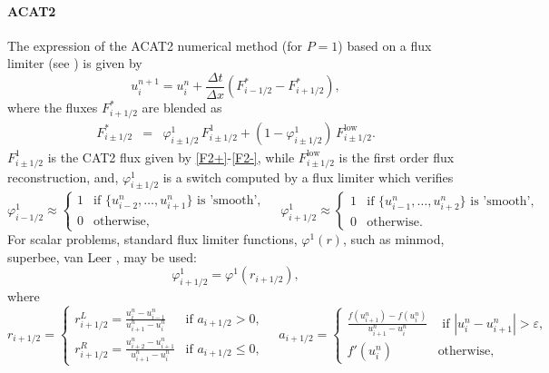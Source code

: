 \paragraph{ACAT2}
The expression of the ACAT2 numerical method (for $P=1$) based on a flux limiter (see \cite{LeVeque2002book,LeVeque2007book,Toro2009}) is given by
\begin{equation}\label{ACAT2meth}
     u_i^{n+1} = u_i^n + \frac{\Delta t}{\Delta x}\left(F^{*}_{i-1/2} - F^{*}_{i+1/2} \right) ,
\end{equation}
where the fluxes $F^{*}_{i+1/2}$ are blended as   
\begin{eqnarray}\label{ACAT2_flux} 
    {F}^*_{i\pm1/2} & = & \varphi^1_{i\pm1/2} \, {F}^1_{i\pm1/2} +(1-\varphi^1_{i\pm1/2}) \, {F}^{\text{low}}_{i\pm1/2}.
\end{eqnarray}
${F}^1_{i\pm1/2}$ is the CAT2 flux given by \eqref{F2+}-\eqref{F2-}, while $F^{\text{low}}_{i\pm1/2}$ is the first order flux reconstruction, and, $\varphi^1_{i\pm 1/2}$ is a switch computed by a flux limiter which verifies
\begin{equation} \nonumber
    \varphi^1_{i-1/2} \approx \begin{cases}
        1 &\text{if $\{ u_{i-2}^n, \dots, u_{i+1}^n \}$ is 'smooth'}, \\
        0 & \text{otherwise,}
    \end{cases}
    \quad
    \varphi^1_{i+1/2} \approx \begin{cases}
        1 &\text{if $\{ u_{i-1}^n, \dots, u_{i+2}^n \}$ is 'smooth'}, \\
        0 & \text{otherwise.}
    \end{cases}
\end{equation}
For scalar problems, standard flux limiter functions, $\varphi^1(r)$, such as minmod, superbee, van Leer \cite{Sweby,Kemm2010}, may  be used:
\begin{equation}\label{indicador1}
    \varphi_{i+1/2}^1  =  \varphi^1(r_{i+1/2}), 
\end{equation}
where
\begin{equation}\label{wavefuction}
        r_{i+1/2}=
         \left\{
        \begin{array}{cl}
            \displaystyle r^L_{i+1/2}= 
            \frac{u^n_i-u^n_{i-1}}{u^n_{i+1}-u^n_{i}} & \mbox {if } a_{i+1/2}  >0, \\
            \displaystyle  r^R_{i+1/2}= 
            \frac{u^n_{i+2}-u^n_{i+1}}{u^n_{i+1}-u^n_{i}} & \mbox {if } a_{i+1/2}  \leq 0,
        \end{array}\right.
        \quad 
        a_{i+1/2} = \begin{cases}  \displaystyle \frac{f(u^n_{i+1}) - f(u^n_i)}{u^n_{i+1} - u^n_i} & \text{ if $|u^n_i - u^n_{i+1}|> \varepsilon$} ,\\
    f'(u^n_i) & \text{otherwise,}
    \end{cases}
\end{equation}
